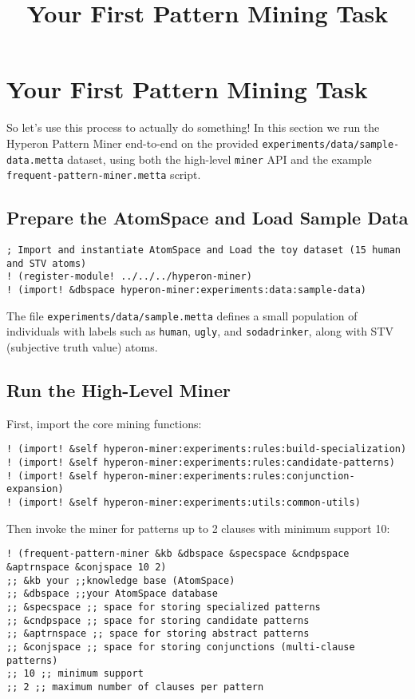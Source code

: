 \documentclass{article}
\title{Your First Pattern Mining Task}
\begin{document}
\section{Your First Pattern Mining Task}

So let's use this process to actually do something!  In this section we run the Hyperon Pattern Miner end-to-end on the provided \texttt{experiments/data/sample-data.metta} dataset, using both the high-level \texttt{miner} API and the example \texttt{frequent-pattern-miner.metta} script.

\subsection{Prepare the AtomSpace and Load Sample Data}

\begin{verbatim}
; Import and instantiate AtomSpace and Load the toy dataset (15 human and STV atoms)
! (register-module! ../../../hyperon-miner)
! (import! &dbspace hyperon-miner:experiments:data:sample-data)
\end{verbatim}

The file \texttt{experiments/data/sample.metta} defines a small population of individuals with labels such as \texttt{human}, \texttt{ugly}, and \texttt{sodadrinker}, along with STV (subjective truth value) atoms.

\subsection{Run the High-Level Miner}

First, import the core mining functions:

\begin{verbatim}
! (import! &self hyperon-miner:experiments:rules:build-specialization)
! (import! &self hyperon-miner:experiments:rules:candidate-patterns)
! (import! &self hyperon-miner:experiments:rules:conjunction-expansion)
! (import! &self hyperon-miner:experiments:utils:common-utils)
\end{verbatim}

Then invoke the miner for patterns up to 2 clauses with minimum support 10:

\begin{verbatim}
! (frequent-pattern-miner &kb &dbspace &specspace &cndpspace &aptrnspace &conjspace 10 2)
;; &kb your ;;knowledge base (AtomSpace)
;; &dbspace ;;your AtomSpace database
;; &specspace ;; space for storing specialized patterns
;; &cndpspace ;; space for storing candidate patterns
;; &aptrnspace ;; space for storing abstract patterns
;; &conjspace ;; space for storing conjunctions (multi-clause patterns)
;; 10 ;; minimum support
;; 2 ;; maximum number of clauses per pattern
\end{verbatim}
\end{document}
